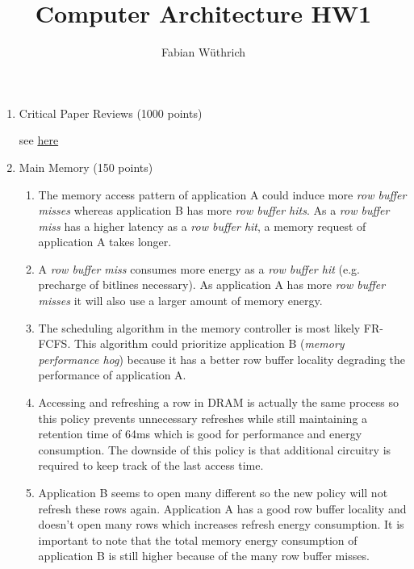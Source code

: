 \documentclass[a4paper]{article}
\title{Computer Architecture HW1}
\author{Fabian Wüthrich}
\begin{document}
\maketitle

\begin{enumerate}
    \item Critical Paper Reviews (1000 points)

        see \href{https://safari.ethz.ch/review/architecture20/}{here}
    
    \item Main Memory (150 points)

    \begin{enumerate}
        \item The memory access pattern of application A could induce more \textit{row
            buffer misses} whereas application B has more \textit{row buffer hits}. As a
            \textit{row buffer miss} has a higher latency as a \textit{row buffer hit}, 
            a memory request of application A takes longer.

        \item A \textit{row buffer miss} consumes more energy as a \textit{row buffer hit}
            (e.g. precharge of bitlines necessary). As application A has more \textit{row
            buffer misses} it will also use a larger amount of memory energy.

        \item The scheduling algorithm in the memory controller is most likely FR-FCFS. This
            algorithm could prioritize application B (\textit{memory performance hog}) because it has 
            a better row buffer locality degrading the performance of application A.
        
        \item Accessing and refreshing a row in DRAM is actually the same process so this policy prevents
            unnecessary refreshes while still maintaining a retention time of 64ms which is good for
            performance and energy consumption. The downside of this policy is that additional circuitry
            is required to keep track of the last access time.

        \item Application B seems to open many different so the new policy will not refresh these rows
            again. Application A has a good row buffer locality and doesn't open many rows which increases
            refresh energy consumption. It is important to note that the total memory energy consumption of
            application B is still higher because of the many row buffer misses.
    \end{enumerate}


\end{enumerate}
\end{document}
